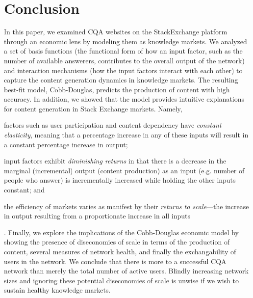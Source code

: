 \section{Conclusion}

In this paper, we examined CQA websites on the StackExchange platform through an economic lens by modeling them as knowledge markets. We analyzed a set of basis functions (the functional form of how an input factor, such as the number of available answerers, contributes to the overall output of the network) and interaction mechanisms (how the input  factors interact with each other) to capture the content generation dynamics in knowledge markets. The resulting best-fit model, Cobb-Douglas, predicts the production of content with high accuracy. In addition, we showed that the model provides intuitive explanations for content generation in Stack Exchange markets. Namely, \begin{enumerate*}
    \item factors such as user participation and content dependency have \emph{constant elasticity}, meaning that a percentage increase in any of these inputs will result in a constant percentage increase in output;
    \item input factors exhibit \emph{diminishing returns} in that there is a decrease in the marginal (incremental) output (content production) as an input (e.g. number of people who answer) is incrementally increased while holding the other inputs constant; and
    \item the efficiency of markets varies as manifest by their \emph{returns to scale}---the increase in output resulting from a proportionate increase in all inputs
\end{enumerate*}. Finally, we explore the implications of the Cobb-Douglas economic model by showing the presence of diseconomies of scale in terms of the production of content, several measures of network health, and finally the exchangability of users in the network. We conclude that there is more to a successful CQA network than merely the total number of active users. Blindly increasing network sizes and ignoring these potential diseconomies of scale is unwise if we wish to sustain healthy knowledge markets.

